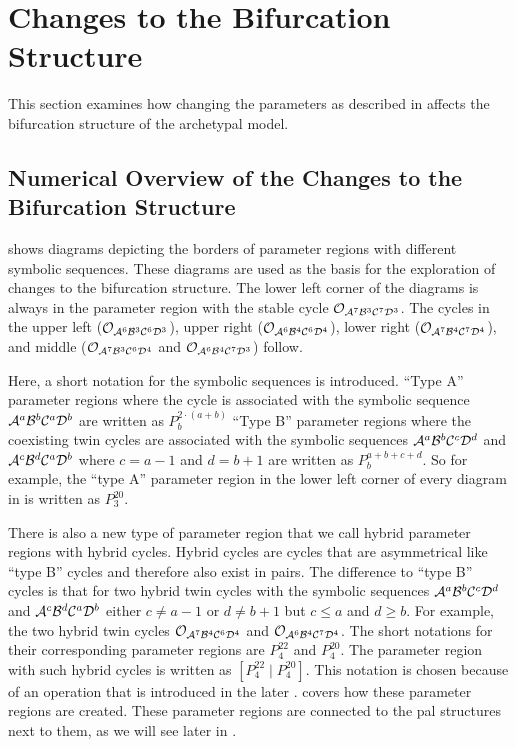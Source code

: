 \section{Changes to the Bifurcation Structure}
\label{sec:add.change}

This section examines how changing the parameters as described in  affects the bifurcation structure of the archetypal model.

\subsection{Numerical Overview of the Changes to the Bifurcation Structure}
\label{sec:add.change.num}

 shows diagrams depicting the borders of parameter regions with different symbolic sequences.
These diagrams are used as the basis for the exploration of changes to the bifurcation structure.
The lower left corner of the diagrams is always in the parameter region with the stable cycle $\mathcal{O}_{\mathcal{A}^7\mathcal{B}^3\mathcal{C}^7\mathcal{D}^3}$.
The cycles in the upper left ($\mathcal{O}_{\mathcal{A}^6\mathcal{B}^3\mathcal{C}^6\mathcal{D}^3}$), upper right ($\mathcal{O}_{\mathcal{A}^6\mathcal{B}^4\mathcal{C}^6\mathcal{D}^4}$), lower right ($\mathcal{O}_{\mathcal{A}^7\mathcal{B}^4\mathcal{C}^7\mathcal{D}^4}$), and middle ($\mathcal{O}_{\mathcal{A}^7\mathcal{B}^3\mathcal{C}^6\mathcal{D}^4}$ and $\mathcal{O}_{\mathcal{A}^6\mathcal{B}^4\mathcal{C}^7\mathcal{D}^3}$) follow.

Here, a short notation for the symbolic sequences is introduced.
``Type A'' parameter regions where the cycle is associated with the symbolic sequence $\mathcal{A}^a\mathcal{B}^b\mathcal{C}^a\mathcal{D}^b$ are written as $P^{2 \cdot \left(a + b\right)}_b$
``Type B'' parameter regions where the coexisting twin cycles are associated with the symbolic sequences $\mathcal{A}^a\mathcal{B}^b\mathcal{C}^c\mathcal{D}^d$ and $\mathcal{A}^c\mathcal{B}^d\mathcal{C}^a\mathcal{D}^b$ where $c = a - 1$ and $d = b + 1$ are written as $P^{a + b + c + d}_b$.
So for example, the ``type A'' parameter region in the lower left corner of every diagram in  is written as $P^{20}_3$.

There is also a new type of parameter region that we call hybrid parameter regions with hybrid cycles.
Hybrid cycles are cycles that are asymmetrical like ``type B'' cycles and therefore also exist in pairs.
The difference to ``type B'' cycles is that for two hybrid twin cycles with the symbolic sequences $\mathcal{A}^a\mathcal{B}^b\mathcal{C}^c\mathcal{D}^d$ and $\mathcal{A}^c\mathcal{B}^d\mathcal{C}^a\mathcal{D}^b$ either $c \neq a - 1$ or $d \neq b + 1$ but $c \leq a$ and $d \geq b$.
For example, the two hybrid twin cycles $\mathcal{O}_{\mathcal{A}^7\mathcal{B}^4\mathcal{C}^6\mathcal{D}^4}$ and $\mathcal{O}_{\mathcal{A}^6\mathcal{B}^4\mathcal{C}^7\mathcal{D}^4}$.
The short notations for their corresponding parameter regions are $P^{22}_4$ and $P^{20}_4$.
The parameter region with such hybrid cycles is written as $\left[P^{22}_4 \mid P^{20}_4\right]$.
This notation is chosen because of an operation that is introduced in the later .
 covers how these parameter regions are created.
These parameter regions are connected to the \gls{pal} structures next to them, as we will see later in .

